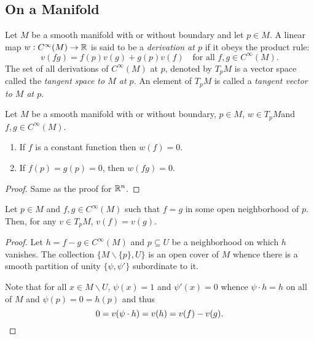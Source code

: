 \subsection{On a Manifold}

\begin{definition}
    Let $M$ be a smooth manifold with or without boundary and let $p\in M$. A linear map $w: C^\infty(M)\to\mathbb{R}$ is said to be a \emph{derivation at $p$} if it obeys the product rule:
    \begin{equation*}
        v(fg) = f(p)v(g) + g(p)v(f)\quad\text{for all }f,g\in C^\infty(M).
    \end{equation*}
    The set of all derivations of $C^\infty(M)$ at $p$, denoted by $T_pM$ is a vector space called the \emph{tangent space to $M$ at $p$}. An element of $T_pM$ is called a \emph{tangent vector to $M$ at $p$}.
\end{definition}

\begin{lemma}
    Let $M$ be a smooth manifold with or without boundary, $p\in M$, $w\in T_pM$and $f,g\in C^\infty(M)$. 
    \begin{enumerate}[label=(\alph*)]
        \item If $f$ is a constant function then $w(f) = 0$. 
        \item If $f(p) = g(p) = 0$, then $w(fg) = 0$.
    \end{enumerate}
\end{lemma}
\begin{proof}
    Same as the proof for $\mathbb{R}^n$.
\end{proof}

\begin{lemma}
    Let $p\in M$ and $f,g\in C^\infty(M)$ such that $f = g$ in some open neighborhood of $p$. Then, for any $v\in T_pM$, $v(f) = v(g)$.
\end{lemma}
\begin{proof}
    Let $h = f - g\in C^\infty(M)$ and $p\subseteq U$ be a neighborhood on which $h$ vanishes. The collection $\{M\backslash\{p\}, U\}$ is an open cover of $M$ whence there is a smooth partition of unity $\{\psi,\psi'\}$ subordinate to it. 

    Note that for all $x\in M\backslash U$, $\psi(x) = 1$ and $\psi'(x) = 0$ whence $\psi\cdot h = h$ on all of $M$ and $\psi(p) = 0 = h(p)$ and thus 
    \begin{equation*}
        0 = v(\psi\cdot h) = v(h) = v(f) - v(g).\qedhere
    \end{equation*}
\end{proof}


